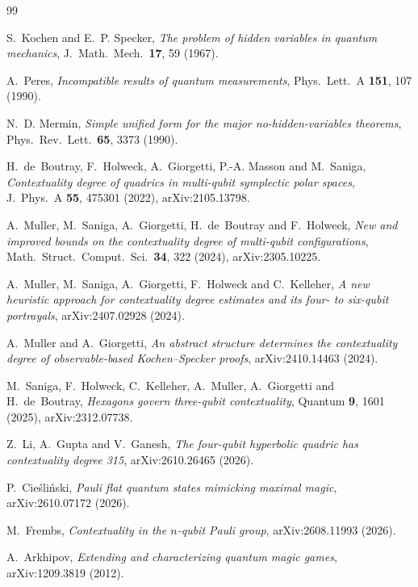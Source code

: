 \documentclass[a4paper,onecolumn,11pt,unpublished,nopdfoutputerror]{quantumarticle}
\theoremstyle{definition}
\begin{document}
\begin{thebibliography}{99}
\small

 S.~Kochen and E.~P. Specker, \emph{The problem of hidden variables in quantum mechanics},
J.\ Math.\ Mech.\ \textbf{17}, 59 (1967).

 A.~Peres, \emph{Incompatible results of quantum measurements}, Phys.\ Lett.\ A \textbf{151}, 107
(1990).

 N.~D. Mermin, \emph{Simple unified form for the major no-hidden-variables theorems}, Phys.\ Rev.\
Lett.\ \textbf{65}, 3373 (1990).

 H.~de~Boutray, F.~Holweck, A.~Giorgetti, P.-A. Masson and M.~Saniga, \emph{Contextuality
degree of quadrics in multi-qubit symplectic polar spaces}, J.\ Phys.\ A \textbf{55}, 475301 (2022),
arXiv:2105.13798.

 A.~Muller, M.~Saniga, A.~Giorgetti, H.~de~Boutray and F.~Holweck, \emph{New and improved bounds
on the contextuality degree of multi-qubit configurations}, Math.\ Struct.\ Comput.\ Sci.\ \textbf{34}, 322 (2024),
arXiv:2305.10225.

 A.~Muller, M.~Saniga, A.~Giorgetti, F.~Holweck and C.~Kelleher, \emph{A new heuristic
approach for contextuality degree estimates and its four- to six-qubit portrayals}, arXiv:2407.02928 (2024).

 A.~Muller and A.~Giorgetti, \emph{An abstract structure determines the contextuality
degree of observable-based Kochen--Specker proofs}, arXiv:2410.14463 (2024).

 M.~Saniga, F.~Holweck, C.~Kelleher, A.~Muller, A.~Giorgetti and H.~de~Boutray,
\emph{Hexagons govern three-qubit contextuality}, Quantum \textbf{9}, 1601 (2025), arXiv:2312.07738.

 Z.~Li, A.~Gupta and V.~Ganesh, \emph{The four-qubit hyperbolic quadric has contextuality
degree 315}, arXiv:2610.26465 (2026).

 P.~Cie\'sli\'nski, \emph{Pauli flat quantum states mimicking maximal magic}, arXiv:2610.07172
(2026).

 M.~Frembs, \emph{Contextuality in the $n$-qubit Pauli group}, arXiv:2608.11993 (2026).

 A.~Arkhipov, \emph{Extending and characterizing quantum magic games}, arXiv:1209.3819 (2012).


\end{thebibliography}
\end{document}
